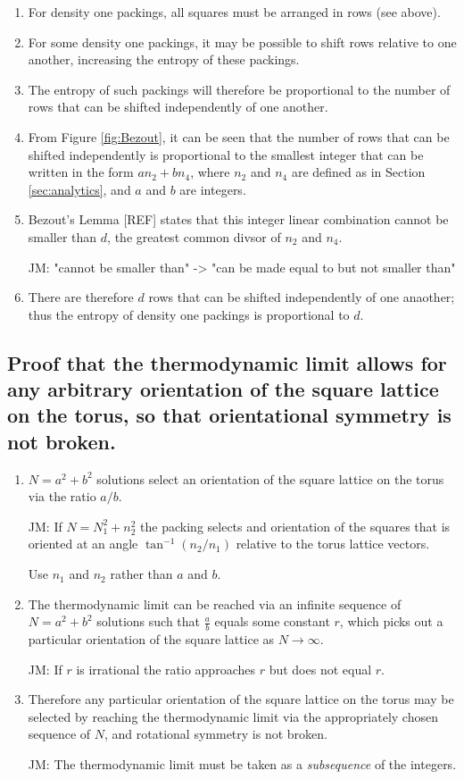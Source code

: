 \begin{enumerate}
\item For density one packings, all squares must be arranged in rows (see above).
\item For some density one packings, it may be possible to shift rows relative to one another, increasing the entropy of these packings.
\item The entropy of such packings will therefore be proportional to the number of rows that can be shifted independently of one another.
\item From Figure \ref{fig:Bezout}, it can be seen that the number of rows that can be shifted independently is proportional to the smallest integer that can be written in the form $a n_2 + b n_4$, where $n_2$ and $n_4$ are defined as in Section \ref{sec:analytics}, and $a$ and $b$ are integers.
\item Bezout's Lemma [REF] states that this integer linear combination cannot be smaller than $d$, the greatest common divsor of $n_2$ and $n_4$. 

JM: "cannot be smaller than" -> "can be made equal to but not smaller than"

\item There are therefore $d$ rows that can be shifted independently of one anaother; thus the entropy of density one packings is proportional to $d$.
\end{enumerate}


\subsection{Proof that the thermodynamic limit allows for any arbitrary orientation of the square lattice on the torus, so that orientational symmetry is not broken.}


\begin{enumerate}
\item $N=a^2+b^2$ solutions select an orientation of the square lattice on the torus via the ratio $a/b$.

JM:  If $N=N_1^2 + n_2^2$ the packing selects and orientation of the squares that is oriented at an angle $\tan^{-1}(n_2/n_1)$ relative to the torus lattice vectors.

Use $n_1$ and $n_2$ rather than $a$ and $b$.

\item The thermodynamic limit can be reached via an infinite sequence of $N=a^2+b^2$ solutions such that $\frac{a}{b}$ equals some constant $r$, which picks out a particular orientation of the square lattice as $N \rightarrow \infty $. 

JM: If $r$ is irrational the ratio approaches $r$ but does not equal $r$.

\item Therefore any particular orientation of the square lattice on the torus may be selected by reaching the thermodynamic limit via the appropriately chosen sequence of $N$, and rotational symmetry is not broken.

JM: The thermodynamic limit must be taken as a {\em subsequence} of the integers.
\end{enumerate}


